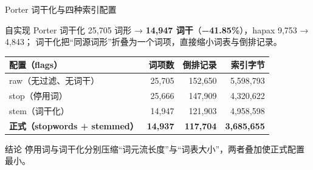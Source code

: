 \documentclass[UTF8,fontset=none,aspectratio=169,10pt]{ctexbeamer}
\newcommand{\key}[1]{\textcolor{accent}{\textbf{#1}}}
\newcommand{\src}[1]{\par\vspace{0.5em}{\fontsize{8}{9.6}\selectfont\color{gray}#1\par}}
\newcommand{\vsp}{\vspace*{\stretch{1}}}
\begin{document}
\begin{frame}{Porter 词干化与四种索引配置}
  \begin{block}{自实现 Porter 词干化}
    \small
    25,705 词形 → \key{14,947 词干}（\key{−41.85\%}），hapax 9,753 → 4,843；
    词干化把``同源词形''折叠为一个词项，直接缩小词表与倒排记录。
  \end{block}
  \vspace{0.6em}
  \begin{center}
  \small
  \begin{tabularx}{0.95\textwidth}{L r r r}
    \toprule
    配置（flags） & 词项数 & 倒排记录 & 索引字节 \\
    \midrule
    raw（无过滤、无词干） & 25,705 & 152,650 & 5,598,793 \\
    stop（停用词） & 25,666 & 147,909 & 4,320,622 \\
    stem（词干化） & 14,947 & 121,903 & 4,958,598 \\
    \key{正式（stopwords + stemmed）} & \key{14,937} & \key{117,704} & \key{3,685,655} \\
    \bottomrule
  \end{tabularx}
  \end{center}
  \vsp
  \begin{block}{结论}
    \small 停用词与词干化分别压缩``词元流长度''与``词表大小''，两者叠加使正式配置最小。
  \end{block}
\end{frame}
\end{document}
